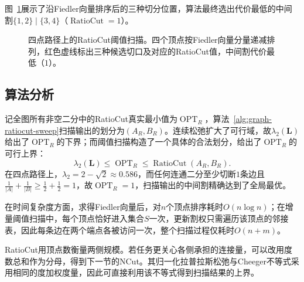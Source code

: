 图~\ref{fig:ratiocut-sweep-candidates}展示了沿Fiedler向量排序后的三种切分位置，算法最终选出代价最低的中间割$\{1,2\}\mid\{3,4\}$（$\operatorname{RatioCut}=1$）。

\begin{figure}[!htb]
\centering
{}
\caption{四点路径上的RatioCut阈值扫描。四个顶点按Fiedler向量分量递减排列，红色虚线标出三种候选切口及对应的RatioCut值，中间割代价最低（$1$）。}
\label{fig:ratiocut-sweep-candidates}
\end{figure}

\subsection{算法分析}
\label{sec:graph-ratiocut-guarantee}

记全图所有非空二分中的RatioCut真实最小值为$\operatorname{OPT}_R$，算法~\ref{alg:graph-ratiocut-sweep}扫描输出的划分为$(A_R,B_R)$。连续松弛扩大了可行域，故$\lambda_2(\bm L)$给出了$\operatorname{OPT}_R$的下界；而阈值扫描构造了一个具体的合法划分，给出了$\operatorname{OPT}_R$的可行上界：
\begin{equation}
\label{eq:graph-ratiocut-bounds}
\lambda_2(\bm L)\leq\operatorname{OPT}_R
\leq\operatorname{RatioCut}(A_R,B_R).
\end{equation}
在四点路径上，$\lambda_2=2-\sqrt 2\approx 0.586$，而任何连通二分至少切断$1$条边且$\frac{1}{|A|}+\frac{1}{|B|}\geq\frac{1}{2}+\frac{1}{2}=1$，故$\operatorname{OPT}_R=1$，扫描输出的中间割精确达到了全局最优。

在时间复杂度方面，求得Fiedler向量后，对$n$个顶点排序耗时$O(n\log n)$；在增量阈值扫描中，每个顶点恰好进入集合$S$一次，更新割权只需遍历该顶点的邻接表，因此每条边在两个端点各被访问一次，整个扫描过程仅耗时$O(n+m)$。

RatioCut用顶点数衡量两侧规模。若任务更关心各侧承担的连接量，可以改用度数总和作为分母，得到下一节的NCut。其归一化拉普拉斯松弛与Cheeger不等式采用相同的度加权度量，因此可直接利用该不等式得到扫描结果的上界。
